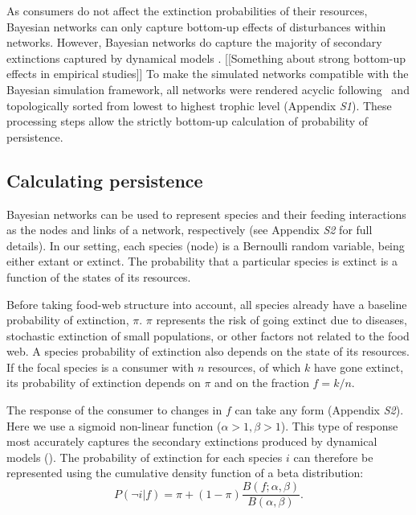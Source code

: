 \documentclass[12pt]{article}
\begin{document}
\begin{spacing}{2.0}
    As consumers do not affect the extinction probabilities of their resources, Bayesian networks can only capture bottom-up effects of disturbances within networks. 
    However, Bayesian networks do capture the majority of secondary extinctions captured by dynamical models \citep{Eklof2013}.
    [[Something about strong bottom-up effects in empirical studies]]
	To make the simulated networks compatible with the Bayesian simulation framework, all networks were rendered acyclic following~\citet{Allesina2009functional} and topologically sorted from lowest to highest trophic level (Appendix \emph{S1}).
	These processing steps allow the strictly bottom-up calculation of probability of persistence.
	
		
	\subsection*{Calculating persistence}	
        Bayesian networks can be used to represent species and their feeding interactions as the nodes and links of a network, respectively (see Appendix \emph{S2} for full details).
        In our setting, each species (node) is a Bernoulli random variable, being either extant or extinct. 
        The probability that a particular species is extinct is a function of the states of its resources.
        
		Before taking food-web structure into account, all species already have a baseline probability of extinction, $\pi$. 
		$\pi$ represents the risk of going extinct due to diseases, stochastic extinction of small populations, or other factors not related to the food web.
		A species probability of extinction also depends on the state of its resources. 
        If the focal species is a consumer with $n$ resources, of which $k$ have gone extinct, its probability of extinction depends on $\pi$ and on the fraction $f = k/n$.
        
        
        The response of the consumer to changes in $f$ can take any form (Appendix \emph{S2}). Here we use a sigmoid non-linear function ($\alpha > 1, \beta > 1$).
		This type of response most accurately captures the secondary extinctions produced by dynamical models (\citealp[]{Eklof2013}).
		The probability of extinction for each species $i$ can therefore be represented using the cumulative density function of a beta distribution:
		\begin{equation}
		P(\lnot i|f) = \pi + (1 - \pi) \frac{B(f;\alpha,\beta)}{B(\alpha,\beta)}.
				\label{betafunc}
        \end{equation}
		

\end{spacing}
\end{document}
